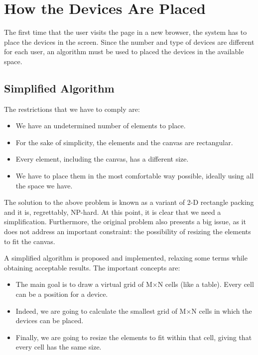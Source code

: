 \section{How the Devices Are Placed}
\label{sec:positioning}

The first time that the user visits the page in a new browser, the system has
to place the devices in the screen. Since the number and type of devices are
different for each user, an algorithm must be used to placed the devices in
the available space.

\subsection{Simplified Algorithm}

The restrictions that we have to comply are:

\begin{itemize}
  \item We have an undetermined number of elements to place.
  \item For the sake of simplicity, the elements and the canvas are
  rectangular.
  \item Every element, including the canvas, has a different size.
  \item We have to place them in the most comfortable way possible, ideally
  using all the space we have.
\end{itemize}

The solution to the above problem is known as a variant of 2-D rectangle
packing and it is, regrettably, NP-hard. At this point, it is clear that we
need a simplification. Furthermore, the original problem also presents a big
issue, as it does not address an important constraint: the possibility of
resizing the elements to fit the canvas.

A simplified algorithm is proposed and implemented, relaxing some terms while obtaining acceptable results. The important concepts are:

\begin{itemize}
  \item The main goal is to draw a virtual grid of M$\times$N cells (like a table). Every cell can be a position for a device.
  \item Indeed, we are going to calculate the smallest grid of M$\times$N cells in which the devices can be placed.
  \item Finally, we are going to resize the elements to fit within that cell, giving that every cell has the same size.
\end{itemize}

